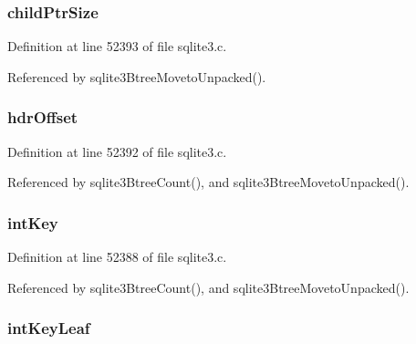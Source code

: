 \subsubsection[{child\+Ptr\+Size}]{ child\+Ptr\+Size}\label{struct_mem_page_aaa3442066b65e5022cc4aeb3e03e62ea}


Definition at line 52393 of file sqlite3.\+c.



Referenced by sqlite3\+Btree\+Moveto\+Unpacked().

\hypertarget{struct_mem_page_a41b31a2714c96b8661dd7d3beb33e502}{}
\subsubsection[{hdr\+Offset}]{ hdr\+Offset}\label{struct_mem_page_a41b31a2714c96b8661dd7d3beb33e502}


Definition at line 52392 of file sqlite3.\+c.



Referenced by sqlite3\+Btree\+Count(), and sqlite3\+Btree\+Moveto\+Unpacked().

\hypertarget{struct_mem_page_a0a18797b49604a12c9423fcd16a8a03c}{}
\subsubsection[{int\+Key}]{ int\+Key}\label{struct_mem_page_a0a18797b49604a12c9423fcd16a8a03c}


Definition at line 52388 of file sqlite3.\+c.



Referenced by sqlite3\+Btree\+Count(), and sqlite3\+Btree\+Moveto\+Unpacked().

\hypertarget{struct_mem_page_a4890917911842a160e87e23a59bb99c9}{}
\subsubsection[{int\+Key\+Leaf}]{ int\+Key\+Leaf}\label{struct_mem_page_a4890917911842a160e87e23a59bb99c9}



